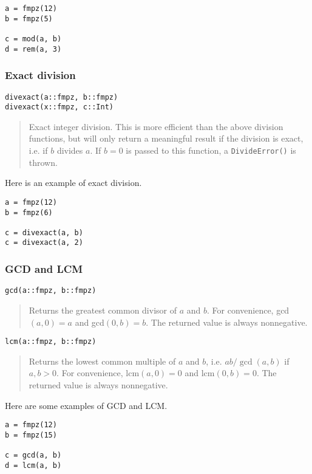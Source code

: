\documentclass[a4paper,10pt]{article}
\newcommand{\code}{\lstinline}
\newcommand{\desc}[1]{\vspace{-3mm}\begin{quote}#1\end{quote}}
\begin{document}
{{\begin{lstlisting}
a = fmpz(12)
b = fmpz(5)

c = mod(a, b)
d = rem(a, 3)
\end{lstlisting}

\subsubsection{Exact division}

\begin{lstlisting}
divexact(a::fmpz, b::fmpz)
divexact(x::fmpz, c::Int)
\end{lstlisting}

\desc{Exact integer division. This is more efficient than the above division functions,
but will only return a meaningful result if the division is exact, i.e. if $b$ divides
$a$. If $b = 0$ is passed to this function, a \code{DivideError()} is thrown.}

Here is an example of exact division.

\begin{lstlisting}
a = fmpz(12)
b = fmpz(6)

c = divexact(a, b)
c = divexact(a, 2)
\end{lstlisting}

\subsubsection{GCD and LCM}

\begin{lstlisting}
gcd(a::fmpz, b::fmpz)
\end{lstlisting}

\desc{Returns the greatest common divisor of $a$ and $b$. For convenience, 
gcd$(a, 0) = a$ and gcd$(0, b) = b$. The returned value is always nonnegative.}

\begin{lstlisting}
lcm(a::fmpz, b::fmpz)
\end{lstlisting}

\desc{Returns the lowest common multiple of $a$ and $b$, i.e. $ab/\gcd(a, b)$ if
$a, b > 0$. For convenience, lcm$(a, 0) = 0$ and lcm$(0, b) = 0$. The returned
value is always nonnegative.}

Here are some examples of GCD and LCM.

\begin{lstlisting}
a = fmpz(12)
b = fmpz(15)

c = gcd(a, b)
d = lcm(a, b)
\end{lstlisting}

}}
\end{document}
